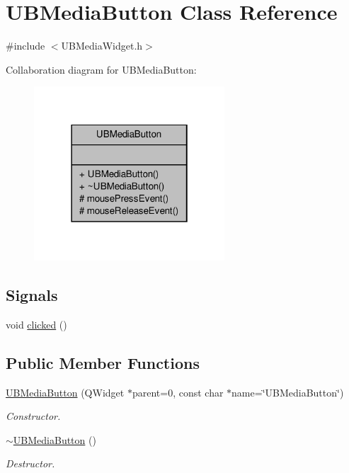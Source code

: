 \hypertarget{class_u_b_media_button}{\section{U\-B\-Media\-Button Class Reference}
\label{d2/d86/class_u_b_media_button}
}


{\ttfamily \#include $<$U\-B\-Media\-Widget.\-h$>$}



Collaboration diagram for U\-B\-Media\-Button\-:
\nopagebreak
\begin{figure}[H]
\begin{center}
\leavevmode
\includegraphics[width=202pt]{d0/dbd/class_u_b_media_button__coll__graph}
\end{center}
\end{figure}
\subsection*{Signals}
\begin{DoxyCompactItemize}
\item 
void \hyperlink{class_u_b_media_button_abf7cff18cfc253d7c2c7418ce36e7506}{clicked} ()
\end{DoxyCompactItemize}
\subsection*{Public Member Functions}
\begin{DoxyCompactItemize}
\item 
\hyperlink{class_u_b_media_button_a24f0531e6b5c1784dea9f512a596492c}{U\-B\-Media\-Button} (Q\-Widget $\ast$parent=0, const char $\ast$name=\char`\"{}U\-B\-Media\-Button\char`\"{})
\begin{DoxyCompactList}\small\item\em Constructor. \end{DoxyCompactList}\item 
\hyperlink{class_u_b_media_button_a0faab7a9a291edba6b2f10d56a2915dd}{$\sim$\-U\-B\-Media\-Button} ()
\begin{DoxyCompactList}\small\item\em Destructor. \end{DoxyCompactList}\end{DoxyCompactItemize}
